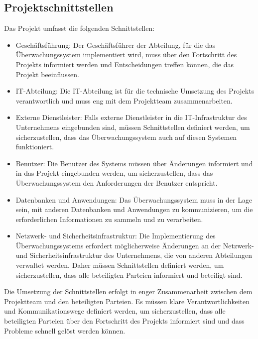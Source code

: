 \begin{flushleft}
\subsection{Projektschnittstellen}
Das Projekt umfasst die folgenden Schnittstellen:
\begin{itemize}
	\item Geschäftsführung: Der Geschäftsführer der Abteilung, für die das Überwachungssystem implementiert wird, muss über den Fortschritt des Projekts informiert werden und Entscheidungen treffen können, die das Projekt beeinflussen.
	\item IT-Abteilung: Die IT-Abteilung ist für die technische Umsetzung des Projekts verantwortlich und muss eng mit dem Projektteam zusammenarbeiten.
	\item Externe Dienstleister: Falls externe Dienstleister in die IT-Infrastruktur des Unternehmens eingebunden sind, müssen Schnittstellen definiert werden, um sicherzustellen, dass das Überwachungssystem auch auf diesen Systemen funktioniert.
	\item Benutzer: Die Benutzer des Systems müssen über Änderungen informiert und in das Projekt eingebunden werden, um sicherzustellen, dass das Überwachungssystem den Anforderungen der Benutzer entspricht.
	\item Datenbanken und Anwendungen: Das Überwachungssystem muss in der Lage sein, mit anderen Datenbanken und Anwendungen zu kommunizieren, um die erforderlichen Informationen zu sammeln und zu verarbeiten.
	\item Netzwerk- und Sicherheitsinfrastruktur: Die Implementierung des Überwachungssystems erfordert möglicherweise Änderungen an der Netzwerk- und Sicherheitsinfrastruktur des Unternehmens, die von anderen Abteilungen verwaltet werden. Daher müssen Schnittstellen definiert werden, um sicherzustellen, dass alle beteiligten Parteien informiert und beteiligt sind.
\end{itemize}
Die Umsetzung der Schnittstellen erfolgt in enger Zusammenarbeit zwischen dem Projektteam und den beteiligten Parteien. Es müssen klare Verantwortlichkeiten und Kommunikationswege definiert werden, um sicherzustellen, dass alle beteiligten Parteien über den Fortschritt des Projekts informiert sind und dass Probleme schnell gelöst werden können.




\end{flushleft}
